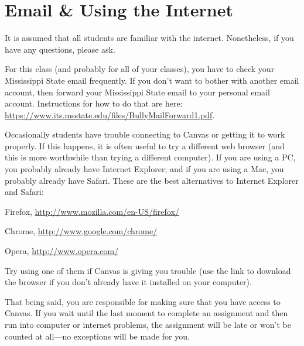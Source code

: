 \section{Email \& Using the Internet}

It is assumed that all students are familiar with the internet. Nonetheless, if you have any questions, please ask. 

For this class (and probably for all of your classes), you have to check your Mississippi State email frequently. If you don’t want to bother with another email account, then forward your Mississippi State email to your personal email account. Instructions for how to do that are here: \url{https://www.its.msstate.edu/files/BullyMailForward1.pdf}.

Occasionally students have trouble connecting to Canvas or getting it to work properly. If this happens, it is often useful to try a different web browser (and this is more worthwhile than trying a different computer). If you are using a PC, you probably already have Internet Explorer; and if you are using a Mac, you probably already have Safari. These are the best alternatives to Internet Explorer and Safari:
\begin{description}
\item Firefox, \url{http://www.mozilla.com/en-US/firefox/} 
\item Chrome, \url{http://www.google.com/chrome/} 
\item Opera, \url{http://www.opera.com/}
\end{description}
Try using one of them if Canvas is giving you trouble (use the link to download the browser if you don’t already have it installed on your computer).

That being said, you are responsible for making sure that you have access to Canvas. If you wait until the last moment to complete an assignment and then run into computer or internet problems, the assignment will be late or won't be counted at all---no exceptions will be made for you.
